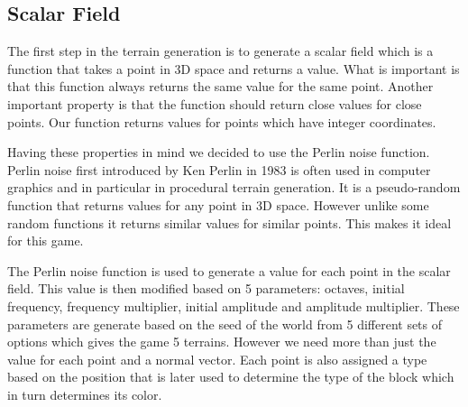 \subsection{Scalar Field} \label{subsec:scalar_field}
The first step in the terrain generation is to generate a scalar field which is a function that takes a point in 3D space and returns a value.
What is important is that this function always returns the same value for the same point.
Another important property is that the function should return close values for close points.
Our function returns values for points which have integer coordinates.

Having these properties in mind we decided to use the Perlin noise function.
Perlin noise first introduced by Ken Perlin in 1983 \cite{Perlin-Noise} is often used in computer graphics and in particular in procedural terrain generation.
It is a pseudo-random function that returns values for any point in 3D space.
However unlike some random functions it returns similar values for similar points.
This makes it ideal for this game.

The Perlin noise function is used to generate a value for each point in the scalar field.
This value is then modified based on 5 parameters: octaves, initial frequency, frequency multiplier, initial amplitude and amplitude multiplier.
These parameters are generate based on the seed of the world from 5 different sets of options which gives the game 5 terrains.
However we need more than just the value for each point and a normal vector.
Each point is also assigned a type based on the position that is later used to determine the type of the block which in turn determines its color.